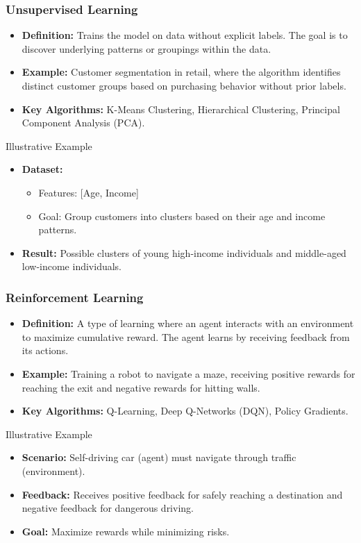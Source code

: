 \documentclass{beamer}
\begin{document}
\begin{frame}[fragile]
    \frametitle{Unsupervised Learning}
    \begin{itemize}
        \item \textbf{Definition:} Trains the model on data without explicit labels. The goal is to discover underlying patterns or groupings within the data.
        \item \textbf{Example:} 
            Customer segmentation in retail, where the algorithm identifies distinct customer groups based on purchasing behavior without prior labels.
        \item \textbf{Key Algorithms:} K-Means Clustering, Hierarchical Clustering, Principal Component Analysis (PCA).
    \end{itemize}
    \begin{block}{Illustrative Example}
        \begin{itemize}
            \item \textbf{Dataset:}
                \begin{itemize}
                    \item Features: [Age, Income]
                    \item Goal: Group customers into clusters based on their age and income patterns.
                \end{itemize}
            \item \textbf{Result:} Possible clusters of young high-income individuals and middle-aged low-income individuals.
        \end{itemize}
    \end{block}
\end{frame}

\begin{frame}[fragile]
    \frametitle{Reinforcement Learning}
    \begin{itemize}
        \item \textbf{Definition:} A type of learning where an agent interacts with an environment to maximize cumulative reward. The agent learns by receiving feedback from its actions.
        \item \textbf{Example:} 
            Training a robot to navigate a maze, receiving positive rewards for reaching the exit and negative rewards for hitting walls.
        \item \textbf{Key Algorithms:} Q-Learning, Deep Q-Networks (DQN), Policy Gradients.
    \end{itemize}
    \begin{block}{Illustrative Example}
        \begin{itemize}
            \item \textbf{Scenario:} Self-driving car (agent) must navigate through traffic (environment).
            \item \textbf{Feedback:} Receives positive feedback for safely reaching a destination and negative feedback for dangerous driving.
            \item \textbf{Goal:} Maximize rewards while minimizing risks.
        \end{itemize}
    \end{block}
\end{frame}
\end{document}
